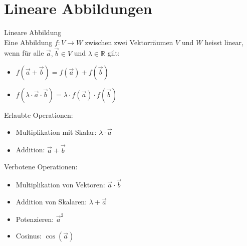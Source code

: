 \graphicspath{{images/}}

\section{Lineare Abbildungen}

\begin{definition}{Lineare Abbildung}\\
    Eine Abbildung $f: V \rightarrow W$ zwischen zwei Vektorräumen $V$ und $W$ heisst linear, wenn für alle $\overrightarrow{a}, \overrightarrow{b} \in V$ und $\lambda \in \mathbb{R}$ gilt:
    \begin{itemize}
        \item $f(\overrightarrow{a} + \overrightarrow{b}) = f(\overrightarrow{a}) + f(\overrightarrow{b})$
        \item $f(\lambda \cdot \overrightarrow{a} \cdot \vec{b}) = \lambda \cdot f(\overrightarrow{a}) \cdot f(\vec{b})$
    \end{itemize}
    \vspace{2mm}
    Erlaubte Operationen:\\
    \begin{minipage}{0.6\linewidth}
        \begin{itemize}
            \item Multiplikation mit Skalar: $\lambda \cdot \vec{a}$
        \end{itemize}
    \end{minipage}
    \begin{minipage}{0.3\linewidth}
        \begin{itemize}
            \item Addition: $\vec{a} + \vec{b}$
        \end{itemize}
    \end{minipage}
    
    Verbotene Operationen:\\
    \begin{minipage}{0.6\linewidth}
        \begin{itemize}
            \item Multiplikation von Vektoren: $\vec{a} \cdot \vec{b}$
            \item Addition von Skalaren: $\lambda + \vec{a}$
        \end{itemize}
    \end{minipage}
    \begin{minipage}{0.3\linewidth}
        \begin{itemize}
            \item Potenzieren: $\vec{a}^2$
            \item Cosinus: $\cos(\vec{a})$
        \end{itemize}
    \end{minipage}
\end{definition}

